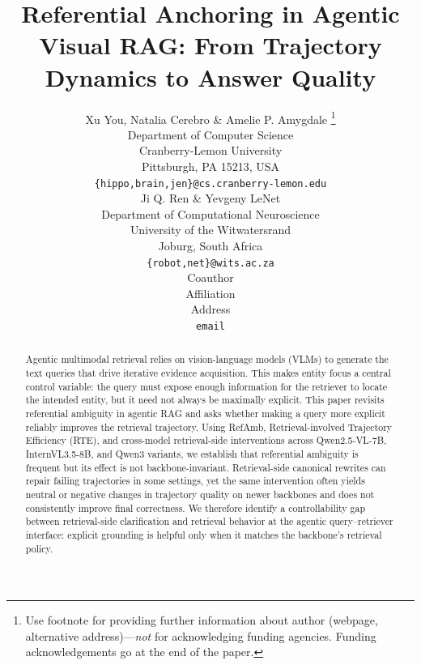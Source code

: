 \documentclass{article} %
\title{Referential Anchoring in Agentic Visual RAG: From Trajectory Dynamics to Answer Quality}
\author{Xu You, Natalia Cerebro \& Amelie P. Amygdale \thanks{ Use footnote for providing further information
about author (webpage, alternative address)---\emph{not} for acknowledging
funding agencies.  Funding acknowledgements go at the end of the paper.} \\
Department of Computer Science\\
Cranberry-Lemon University\\
Pittsburgh, PA 15213, USA \\
\texttt{\{hippo,brain,jen\}@cs.cranberry-lemon.edu} \\
\And
Ji Q. Ren \& Yevgeny LeNet \\
Department of Computational Neuroscience \\
University of the Witwatersrand \\
Joburg, South Africa \\
\texttt{\{robot,net\}@wits.ac.za} \\
\AND
Coauthor \\
Affiliation \\
Address \\
\texttt{email}
}
\begin{document}
\maketitle

\begin{abstract}
Agentic multimodal retrieval relies on vision-language models (VLMs) to generate the text queries that drive iterative evidence acquisition.
This makes entity focus a central control variable: the query must expose enough information for the retriever to locate the intended entity, but it need not always be maximally explicit.
This paper revisits referential ambiguity in agentic RAG and asks whether making a query more explicit reliably improves the retrieval trajectory.
Using RefAmb, Retrieval-involved Trajectory Efficiency (RTE), and cross-model retrieval-side interventions across Qwen2.5-VL-7B, InternVL3.5-8B, and Qwen3 variants, we establish that referential ambiguity is frequent but its effect is not backbone-invariant.
Retrieval-side canonical rewrites can repair failing trajectories in some settings, yet the same intervention often yields neutral or negative changes in trajectory quality on newer backbones and does not consistently improve final correctness.
We therefore identify a controllability gap between retrieval-side clarification and retrieval behavior at the agentic query--retriever interface: explicit grounding is helpful only when it matches the backbone's retrieval policy.
\end{abstract}
\end{document}
